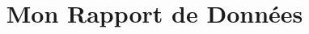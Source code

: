 \documentclass[
  letterpaper,
  DIV=11,
  numbers=noendperiod]{scrartcl}
\title{Mon Rapport de Données}
\author{}
\date{}
\begin{document}
\maketitle


\protect{}\label{tableau-erreurs2}
\end{document}
